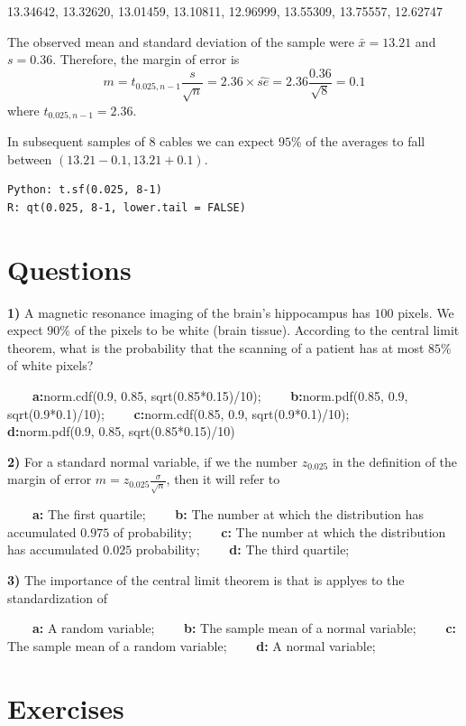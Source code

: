 \documentclass[
]{book}
\begin{document}
13.34642, 13.32620, 13.01459, 13.10811, 12.96999, 13.55309, 13.75557, 12.62747

The observed mean and standard deviation of the sample were \(\bar{x}=13.21\) and \(s=0.36\). Therefore, the margin of error is \[m=t_{0.025, n-1} \frac{s}{\sqrt{n}}=2.36\times \hat{se}=2.36\frac{0.36}{\sqrt{8}}=0.1\]
where \(t_{0.025, n-1}=2.36\).

In subsequent samples of \(8\) cables we can expect \(95\%\) of the averages to fall between \((13.21-0.1,13.21+0.1)\).

\begin{verbatim}
Python: t.sf(0.025, 8-1) 
R: qt(0.025, 8-1, lower.tail = FALSE)
\end{verbatim}

\hypertarget{questions-8}{%
\section{Questions}\label{questions-8}}

\textbf{1)} A magnetic resonance imaging of the brain's hippocampus has \(100\) pixels. We expect \(90\%\) of the pixels to be white (brain tissue). According to the central limit theorem, what is the probability that the scanning of a patient has at most \(85\%\) of white pixels?

\textbf{\(\qquad\)a:}norm.cdf(0.9, 0.85, sqrt(0.85*0.15)/10); \textbf{\(\qquad\)b:}norm.pdf(0.85, 0.9,
sqrt(0.9*0.1)/10); \textbf{\(\qquad\)c:}norm.cdf(0.85, 0.9, sqrt(0.9*0.1)/10); \textbf{\(\qquad\)d:}norm.pdf(0.9, 0.85, sqrt(0.85*0.15)/10)

\textbf{2)} For a standard normal variable, if we the number \(z_{0.025}\) in the definition of the margin of error \(m=z_{0.025} \frac{\sigma}{\sqrt{n}}\), then it will refer to

\textbf{\(\qquad\)a:} The first quartile; \textbf{\(\qquad\)b:} The number at which the distribution has accumulated \(0.975\) of probability; \textbf{\(\qquad\)c:} The number at which the distribution has accumulated \(0.025\) probability; \textbf{\(\qquad\)d:} The third quartile;

\textbf{3)} The importance of the central limit theorem is that is applyes to the standardization of

\textbf{\(\qquad\)a:} A random variable;
\textbf{\(\qquad\)b:} The sample mean of a normal variable;
\textbf{\(\qquad\)c:} The sample mean of a random variable;
\textbf{\(\qquad\)d:} A normal variable;

\hypertarget{exercises-9}{%
\section{Exercises}\label{exercises-9}}
\end{document}
